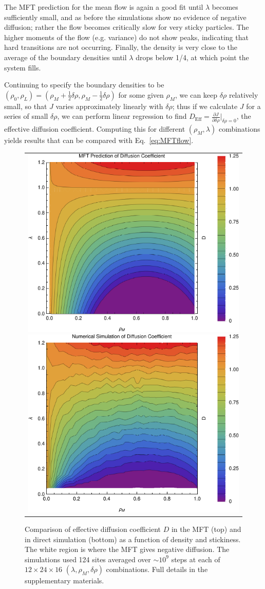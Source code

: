 \documentclass[
reprint, amsmath,amssymb, aps,
]{revtex4-1}
\newcommand{\partDeriv}[2]{\frac{\partial #1}{\partial #2}}
\begin{document}
The MFT prediction for the mean flow is again a good fit until $\lambda$ becomes sufficiently small,
and as before the simulations show no evidence of negative diffusion; rather the flow becomes critically slow for very sticky particles.
The higher moments of the flow (e.g. variance) do not show peaks, indicating that hard transitions are not occurring.
Finally, the density is very close to the average of the boundary densities until $\lambda$ drops below 1/4, at which point the system fills.

Continuing to specify the boundary densities to be $(\rho_0, \rho_L) = (\rho_M + \frac{1}{2} \delta\rho, \rho_M - \frac{1}{2} \delta\rho)$ for some given $\rho_M$, we can keep $\delta\rho$ relatively small, so that $J$ varies approximately
linearly with $\delta\rho$; thus if we calculate $J$ for a series of small $\delta \rho$, we can perform linear regression to find $D_\mathrm{Eff}=\partDeriv{J}{\delta\rho}\big|_{\delta\rho=0}$, the effective diffusion coefficient.
Computing this for different $(\rho_M, \lambda)$ combinations yields results that can be compared with Eq.~\ref{eq:MFTflow}.
\begin{figure}[h!]
\vspace{1em}
\begin{center}
 \begin{tabular}{c}
    \includegraphics[width=0.48\linewidth]{newAnalFlow}
    \includegraphics[width=0.48\linewidth]{newDataFlow}
    \end{tabular}
\end{center}
\caption{\label{fig:diffCoef}
Comparison of effective diffusion coefficient $D$ in the MFT (top) and in direct simulation (bottom) as a function of density and stickiness.
The white region is where the MFT gives negative diffusion. The simulations used 124 sites averaged over $\sim 10^9$ steps at each of $12 \times 24 \times 16 $ $(\lambda, \rho_M, \delta \rho)$ combinations.  
Full details in the supplementary materials.}
    \vspace{-2em}
\end{figure}
\end{document}

